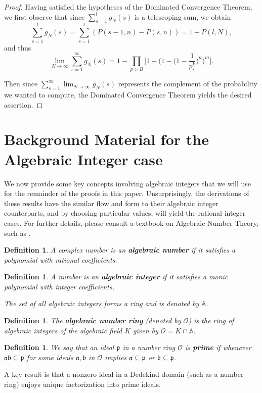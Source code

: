 \documentclass[12pt]{amsart}
\newtheorem{definition}[theorem]{Definition}
\theoremstyle{definition}
\newcommand{\f}[1]{\mathfrak{#1}}
\begin{document}
\begin{proof}
	Having satisfied the hypotheses of the Dominated Convergence Theorem, we first observe that since $\sum_{s=1}^l g_N(s)$ is a telescoping sum, we obtain
	$$\sum_{s=1}^l g_N(s) = \sum_{s=1}^l (P(s-1, n) - P(s, n)) = 1 - P(l, N),$$ 
	and thus
	$$\lim_{N \to \infty} \sum_{s=1}^{\infty} g_N(s) = 1 - \prod_{p > B} \Big[1 - \Big(1 - \Big(1 - \frac{1}{p^k_i}  \Big)^n\Big)^m\Big].$$
	
	\noindent Then since $\displaystyle \sum_{s=1}^{\infty} \lim_{N \to \infty} g_N(s)$ represents the complement of the probability we wanted to compute, the Dominated Convergence Theorem yields the desired assertion.
\end{proof}



\section{Background Material for the Algebraic Integer case}
We now provide some key concepts involving algebraic integers that we will use for the remainder of the proofs in this paper. Unsurprisingly, the derivations of these results have the similar flow and form to their algebraic integer counterparts, and by choosing particular values, will yield the rational integer cases. For further details, please consult a textbook on Algebraic Number Theory, such as \cite{Marcus}.

\begin{definition} A complex number is an \textbf{algebraic number} if it satisfies a polynomial with rational coefficients.
\end{definition}

\begin{definition}A number is an \textbf{algebraic integer} if it satisfies a monic polynomial with integer coefficients.
	
	The set of all algebraic integers forms a ring and is denoted by \(\mathbb{A}\).
\end{definition}

\begin{definition} The \textbf{algebraic number ring} (denoted by \(\mathcal{O}\)) is the ring of algebraic integers of the algebraic field \(K\) given by \(\mathcal{O}=K\cap \mathbb{A}\). 
\end{definition}

\begin{definition} 
	We say that an ideal \(\f{p}\) in a number ring $\mathcal{O}$ is \textbf{prime} if whenever \(\f{ab}\subseteq \f{p}\) for some ideals \(\f{a},\f{b}\) in $\mathcal{O}$ implies \(\f{a}\subseteq \f{p}\) or \(\f{b} \subseteq \f{p}\).  
\end{definition}
A key result is that a nonzero ideal in a Dedekind domain (such as a number ring) enjoys unique factorization into prime ideals. 
\end{document}
